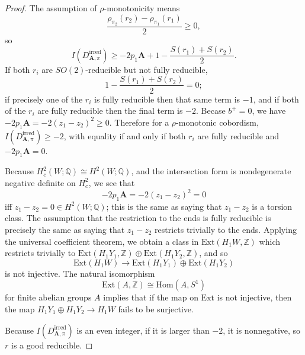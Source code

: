 \documentclass[10pt,a4paper]{amsart}
\theoremstyle{definition}
\theoremstyle{remark}
\numberwithin{figure}{qchap}
\begin{document}
\begin{proof}The assumption of $\rho$-monotonicity means 
$$\frac{\rho_{\pi_2}(r_2) - \rho_{\pi_1}(r_1)}{2} \geq 0,$$ 
so 
$$I(D^{\text{irred}}_{\mathbf{A},\pi}) \geq -2p_1 \mathbf{A} + 1 - \frac{S(r_1)+S(r_2)}{2}.$$ 
If both $r_i$ are $SO(2)$-reducible but not fully reducible, $$1 - \frac{S(r_1)+S(r_2)}{2} = 0;$$ if precisely one of the $r_i$ is fully reducible then that same term is $-1$, and if both of the $r_i$ are fully reducible then the final term is $-2$. Becase $b^+ = 0$, we have $-2p_1 \mathbf{A} = -2(z_1 - z_2)^2 \geq 0$. Therefore for a $\rho$-monotonic cobordism, $I(D^{\text{irred}}_{\mathbf{A},\pi}) \geq -2$, with equality if and only if both $r_i$ are fully reducible and $-2 p_1 \mathbf{A} = 0$. 

Because $H^2_c(W;\mathbb Q) \cong H^2(W;\mathbb Q)$, and the intersection form is nondegenerate negative definite on $H^2_c$, we see that 
$$-2p_1 \mathbf{A} = -2(z_1 - z_2)^2 = 0$$ 
iff $z_1 - z_2 = 0 \in H^2(W;\mathbb Q)$; this is the same as saying that $z_1 - z_2$ is a torsion class. The assumption that the restriction to the ends is fully reducible is precisely the same as saying that $z_1 - z_2$ restricts trivially to the ends. Applying the universal coefficient theorem, we obtain a class in $\text{Ext}(H_1 W, \mathbb Z)$ which restricts trivially to $\text{Ext}(H_1 Y_1, \mathbb Z) \oplus \text{Ext}(H_1 Y_2, \mathbb Z)$, and so 
$$\text{Ext}(H_1 W) \to \text{Ext}(H_1 Y_1) \oplus \text{Ext}(H_1 Y_2)$$ 
is not injective. The natural isomorphism $$\text{Ext}(A, \mathbb Z) \cong \text{Hom}(A, S^1)$$ for finite abelian groups $A$ implies that if the map on $\text{Ext}$ is not injective, then the map $H_1 Y_1 \oplus H_1 Y_2 \to H_1 W$ fails to be surjective.

Because $I(D^{\text{irred}}_{\mathbf{A},\pi})$ is an even integer, if it is larger than $-2$, it is nonnegative, so $r$ is a good reducible. 
\end{proof}
\end{document}

